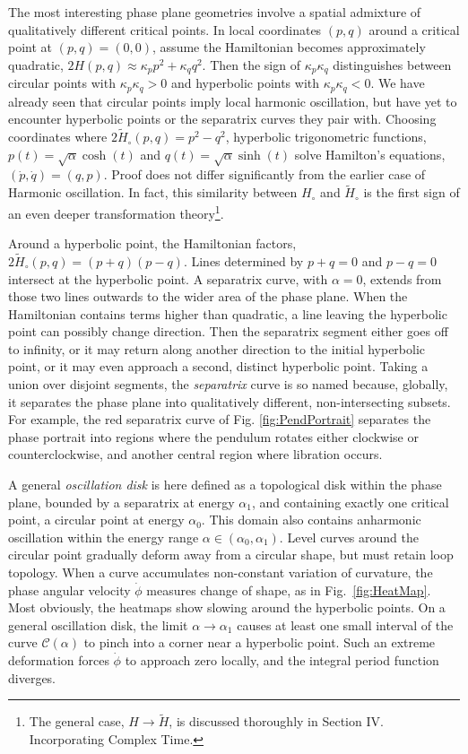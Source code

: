 \documentclass[nofootinbib,preprint]{revtex4-1}
\begin{document}
The most interesting phase plane geometries involve a spatial admixture of qualitatively different 
critical points. In local coordinates $(p,q)$ around a critical point at ${(p,q)=(0,0)}$, assume the 
Hamiltonian becomes approximately quadratic, ${2H(p,q)\approx \kappa_p p^2+\kappa_q q^2}$. Then the sign 
of $\kappa_p\kappa_q$ distinguishes between circular points with $\kappa_p\kappa_q>0$ and hyperbolic 
points with $\kappa_p\kappa_q < 0$. We have already seen that circular points imply local harmonic 
oscillation, but have yet to encounter hyperbolic points or the separatrix curves they pair with. 
Choosing coordinates where $2\widetilde{H}_{\circ}(p,q)=p^2-q^2$, hyperbolic trigonometric functions, 
${p(t) = \sqrt{\alpha}\cosh(t)}$ and ${q(t) = \sqrt{\alpha}\sinh(t)}$ solve Hamilton's equations, 
$(\dot{p},\dot{q})=(q,p)$. Proof does not differ significantly from the earlier case 
of Harmonic oscillation. In fact, this similarity between $H_{\circ}$ and $\widetilde{H}_{\circ}$ 
is the first sign of an even deeper transformation theory\footnote{The general case, 
$H\rightarrow \widetilde{H}$, is discussed thoroughly in Section IV. Incorporating Complex Time.}.

Around a hyperbolic point, the Hamiltonian factors, $2\widetilde{H}_{\circ}(p,q)=(p+q)(p-q)$. Lines determined
by $p+q=0$ and $p-q=0$ intersect at the hyperbolic point. A separatrix curve, with $\alpha=0$, 
extends from those two lines outwards to the wider area of the phase plane. When the Hamiltonian 
contains terms higher than quadratic, a line leaving the hyperbolic point can possibly change 
direction. Then the separatrix segment either goes off to infinity, or it may return along 
another direction to the initial hyperbolic point, or it may even approach a second, distinct 
hyperbolic point. Taking a union over disjoint segments, the \textit{separatrix} curve is so 
named because, globally, it separates the phase plane into qualitatively different, non-intersecting 
subsets. For example, the red separatrix curve of Fig. \ref{fig:PendPortrait} separates the phase 
portrait into regions where the pendulum rotates either clockwise or counterclockwise, and another 
central region where libration occurs. 

A general \textit{oscillation disk} is here defined as a topological disk within the phase plane, 
bounded by a separatrix at energy $\alpha_1$, and containing exactly one critical point, 
a circular point at energy $\alpha_0$. This domain also contains anharmonic oscillation within the energy range 
$\alpha \in (\alpha_0 , \alpha_1)$. Level curves around the circular point gradually deform away from a circular 
shape, but must retain loop topology. When a curve accumulates non-constant variation of curvature, 
the phase angular velocity $\dot{\phi}$ measures change of shape, as in Fig.~\ref{fig:HeatMap}. 
Most obviously, the heatmaps show slowing around the hyperbolic points. On a general oscillation disk, 
the limit $\alpha \rightarrow \alpha_1$ causes at least one small interval of the curve $\mathcal{C}({\alpha})$ 
to pinch into a corner near a hyperbolic point. Such an extreme deformation forces $\dot{\phi}$ to approach zero 
locally, and the integral period function diverges. 
\end{document}
